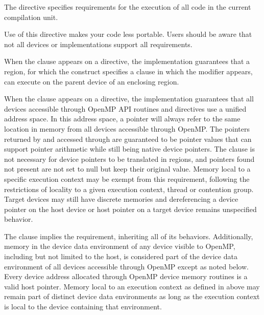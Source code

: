The  directive specifies requirements for the execution of all
code in the current compilation unit.

\begin{note}
Use of this directive makes your code less portable. Users should be aware that not all
devices or implementations support all requirements.
\end{note}

When the  clause appears on a  directive, the
implementation guarantees that a  region, for which the 
construct specifies a  clause in which the  modifier appears,
can execute on the parent device of an enclosing  region.

When the  clause appears on a 
directive, the implementation guarantees that all devices accessible through
OpenMP API routines and directives use a unified address space. In this
address space, a pointer will always refer to the same location in memory
from all devices accessible through OpenMP.  The pointers returned by
 and accessed through  are
guaranteed to be pointer values that can support pointer arithmetic while
still being native device pointers. The  clause is not
necessary for device pointers to be translated in  regions, and
pointers found not present are not set to null but keep their original value.
Memory local to a specific execution context may be exempt from this requirement,
following the restrictions of locality to a given execution context, thread or
contention group.  Target devices may still have discrete memories and
dereferencing a device pointer on the host device or host pointer on a target
device remains unspecified behavior.

The  clause implies the 
requirement, inheriting all of its behaviors.  Additionally, memory in the
device data environment of any device visible to OpenMP, including but not
limited to the host, is considered part of the device data environment of all
devices accessible through OpenMP except as noted below.  Every device address
allocated through OpenMP device memory routines is a valid host pointer. Memory
local to an execution context as defined in  above may remain
part of distinct device data environments as long as the execution context is
local to the device containing that environment.

